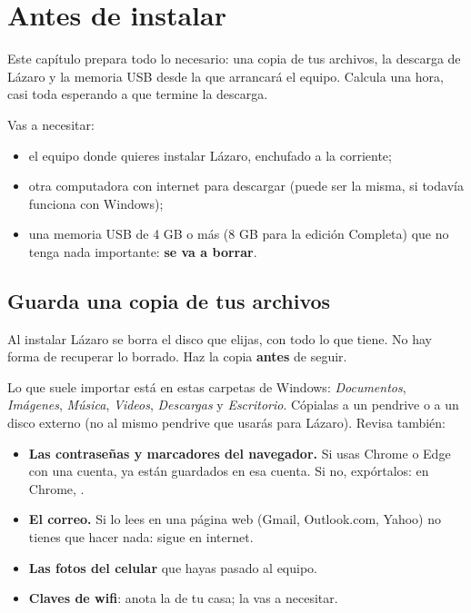 \chapter{Antes de instalar}\label{cap:02-antes-de-instalar}

Este capítulo prepara todo lo necesario: una copia de tus archivos, la
descarga de Lázaro y la memoria USB desde la que arrancará el equipo.
Calcula una hora, casi toda esperando a que termine la descarga.

Vas a necesitar:
\begin{itemize}
  \item el equipo donde quieres instalar Lázaro, enchufado a la corriente;
  \item otra computadora con internet para descargar (puede ser la misma,
        si todavía funciona con Windows);
  \item una memoria USB de 4 GB o más (8 GB para la edición Completa) que
        no tenga nada importante: \textbf{se va a borrar}.
\end{itemize}

\section{Guarda una copia de tus archivos}\label{sec:copia-antes}

\begin{cuidado}
Al instalar Lázaro se borra el disco que elijas, con todo lo que tiene. No
hay forma de recuperar lo borrado. Haz la copia \textbf{antes} de seguir.
\end{cuidado}

Lo que suele importar está en estas carpetas de Windows: \emph{Documentos},
\emph{Imágenes}, \emph{Música}, \emph{Videos}, \emph{Descargas} y
\emph{Escritorio}. Cópialas a un pendrive o a un disco externo (no al
mismo pendrive que usarás para Lázaro). Revisa también:
\begin{itemize}
  \item \textbf{Las contraseñas y marcadores del navegador.} Si usas Chrome
        o Edge con una cuenta, ya están guardados en esa cuenta. Si no,
        expórtalos: en Chrome, .
  \item \textbf{El correo.} Si lo lees en una página web (Gmail, Outlook.com,
        Yahoo) no tienes que hacer nada: sigue en internet.
  \item \textbf{Las fotos del celular} que hayas pasado al equipo.
  \item \textbf{Claves de wifi}: anota la de tu casa; la vas a necesitar.
\end{itemize}

